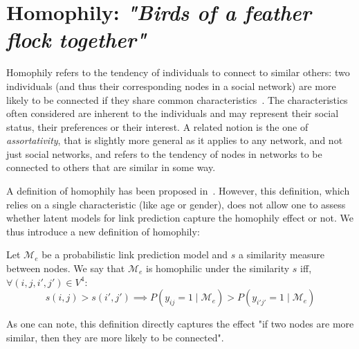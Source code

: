 \documentclass{llncs}
\newcommand{\pr}{P}
\begin{document}
\section{Homophily: \emph{"Birds of a feather flock together"}}
\label{sec:homophily}

Homophily refers to the tendency of individuals to connect to similar others: two individuals (and thus their corresponding nodes in a social network) are more likely to be connected if they share common characteristics~\cite{mcpherson2001birds,lazarsfeld1954friendship}. The characteristics often considered are inherent to the individuals and may represent their social status, their preferences or their interest. A related notion is the one of {\it assortativity}, that is slightly more general as it applies to any network, and not just social networks, and refers to the tendency of nodes in networks to be connected to others that are similar in some way.

A definition of homophily has been proposed in~\cite{la2010randomization}. However, this definition, which relies on a single characteristic (like age or gender), does not allow one to assess whether latent models for link prediction capture the homophily effect or not. We thus introduce a new definition of homophily:
%
\begin{definition}[Homophily] \label{def:homophily}
	Let $\mathcal{M}_e$ be a probabilistic link prediction model and $s$ a similarity measure between nodes. We say that $\mathcal{M}_e$ is homophilic under the similarity $s$ iff, $\forall (i,j,i',j') \in V^4$:
%
\begin{equation}
s(i,j) > s(i',j')  \implies \pr(y_{ij}=1 \mid \mathcal{M}_e) > \pr(y_{i'j'}=1  \mid \mathcal{M}_e) \nonumber
\end{equation}
%
\end{definition}
%
\noindent As one can note, this definition directly captures the effect "if two nodes are more similar, then they are more likely to be connected". 
\end{document}

